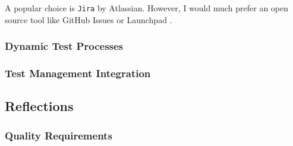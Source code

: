 A popular choice is \texttt{Jira}\cite{tools:jira} by Atlassian. However, I would much
prefer an open source tool like GitHub Issues\cite{tools:github-issues} or
Launchpad \cite{tools:launchpad}.

\subsubsection{Dynamic Test Processes}

\subsubsection{Test Management Integration}

\subsection{Reflections}\label{task-1c-reflect}


\subsubsection{Quality Requirements}

